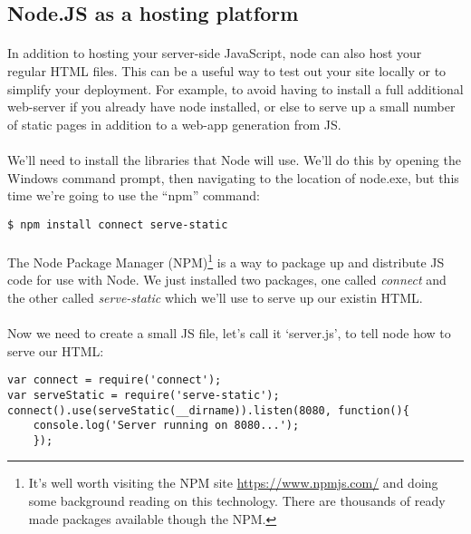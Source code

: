 \documentclass[10pt, a4paper, twosize]{article}
\begin{document}
\subsection{Node.JS as a hosting platform}
\paragraph{} In addition to hosting your server-side JavaScript, node can also host your regular HTML files. This can be a useful way to test out your site locally or to simplify your deployment. For example, to avoid having to install a full additional web-server if you already have node installed, or else to serve up a small number of static pages in addition to a web-app generation from JS. 

\paragraph{} We'll need to install the libraries that Node will use. We'll do this by opening the Windows command prompt, then navigating to the location of node.exe, but this time we're going to use the ``npm'' command:

\begin{lstlisting}[style=DOS]
$ npm install connect serve-static
\end{lstlisting}

\paragraph{} The Node Package Manager (NPM)\footnote{It's well worth visiting the NPM site \url{https://www.npmjs.com/} and doing some background reading on this technology. There are thousands of ready made packages available though the NPM.} is a way to package up and distribute JS code for use with Node. We just installed two packages, one called \emph{connect} and the other called \emph{serve-static} which we'll use to serve up our existin HTML.

\paragraph{} Now we need to create a small JS file, let's call it `server.js', to tell node how to serve our HTML:

\begin{lstlisting}
var connect = require('connect');
var serveStatic = require('serve-static');
connect().use(serveStatic(__dirname)).listen(8080, function(){ 
    console.log('Server running on 8080...');
    });
\end{lstlisting}
\end{document}
